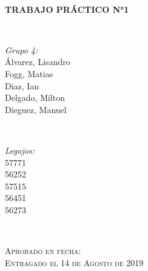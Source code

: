 \documentclass[12pt,a4paper]{article}
\begin{document}
\begin{titlepage}
\HRule \\[0.4cm]
{ \huge \bfseries TRABAJO PRÁCTICO N°1\\ [0.3cm]}

\HRule \\[1.5cm]

 

\begin{minipage}{0.4\textwidth}
\begin{flushleft} \large
\emph{Grupo 4:}\\
Álvarez, Lisandro \\Fogg, Matias\\ Diaz, Ian\\Delgado, Milton\\Dieguez, Manuel %
\end{flushleft}
\end{minipage}
~
\begin{minipage}{0.4\textwidth}
\begin{flushright} \large
\emph{Legajos:} \\
57771\\56252\\57515\\56451\\56273 
\end{flushright}
\end{minipage}\\[1cm]


 \begin{flushleft}
\textsc{\large Aprobado en fecha:  \dotfill}\\[0.5cm] 



\textsc{\large Entragado el 14 de Agosto de 2019}\\
 \end{flushleft}


\vfill %

\end{titlepage}
\end{document}
